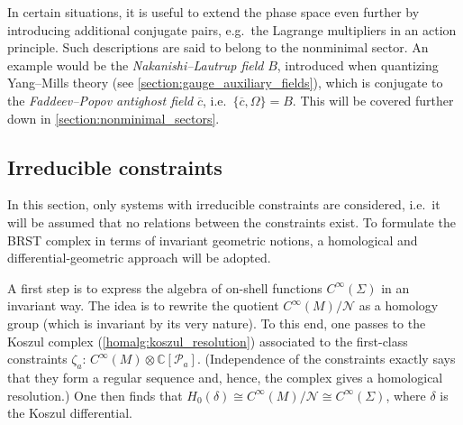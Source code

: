     \begin{remark}
        In certain situations, it is useful to extend the phase space even further by introducing additional conjugate pairs, e.g.~the Lagrange multipliers in an action principle. Such descriptions are said to belong to the nonminimal sector. An example would be the \textit{Nakanishi--Lautrup field} $B$, introduced when quantizing Yang--Mills theory (see \cref{section:gauge_auxiliary_fields}), which is conjugate to the \textit{Faddeev--Popov antighost field} $\overline{c}$, i.e.~$\{\overline{c},\Omega\}=B$. This will be covered further down in \cref{section:nonminimal_sectors}.
    \end{remark}

\subsection{Irreducible constraints}\label{section:irreducible_constraints}

    In this section, only systems with irreducible constraints are considered, i.e.~it will be assumed that no relations between the constraints exist. To formulate the BRST complex in terms of invariant geometric notions, a homological and differential-geometric approach will be adopted.

    A first step is to express the algebra of on-shell functions $C^\infty(\Sigma)$ in an invariant way. The idea is to rewrite the quotient $C^\infty(M)/\mathcal{N}$ as a homology group (which is invariant by its very nature). To this end, one passes to the Koszul complex (\cref{homalg:koszul_resolution}) associated to the first-class constraints $\zeta_a$: $C^\infty(M)\otimes\mathbb{C}[\mathcal{P}_a]$. (Independence of the constraints exactly says that they form a regular sequence and, hence, the complex gives a homological resolution.) One then finds that $H_0(\delta)\cong C^\infty(M)/\mathcal{N}\cong C^\infty(\Sigma)$, where $\delta$ is the Koszul differential.

